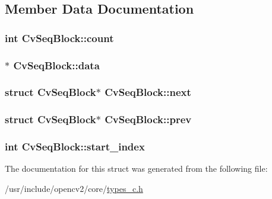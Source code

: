 \subsection{Member Data Documentation}
\hypertarget{structCvSeqBlock_a46540928aea24563e6f58210efc5241b}{
\subsubsection[{count}]{\setlength{\rightskip}{0pt plus 5cm}int Cv\-Seq\-Block\-::count}}\label{structCvSeqBlock_a46540928aea24563e6f58210efc5241b}
\hypertarget{structCvSeqBlock_a590c97caa64f80f3478d9bede539d0ae}{
\subsubsection[{data}]{$\ast$ Cv\-Seq\-Block\-::data}}\label{structCvSeqBlock_a590c97caa64f80f3478d9bede539d0ae}
\hypertarget{structCvSeqBlock_a70b6d4b52105a1e8c5def6227bcc869f}{
\subsubsection[{next}]{\setlength{\rightskip}{0pt plus 5cm}struct {\bf Cv\-Seq\-Block}$\ast$ Cv\-Seq\-Block\-::next}}\label{structCvSeqBlock_a70b6d4b52105a1e8c5def6227bcc869f}
\hypertarget{structCvSeqBlock_a16d7a9e680c3533cc670856b930e25d4}{
\subsubsection[{prev}]{\setlength{\rightskip}{0pt plus 5cm}struct {\bf Cv\-Seq\-Block}$\ast$ Cv\-Seq\-Block\-::prev}}\label{structCvSeqBlock_a16d7a9e680c3533cc670856b930e25d4}
\hypertarget{structCvSeqBlock_a0a34f720596ad287c8a2362017a37d88}{
\subsubsection[{start\-\_\-index}]{\setlength{\rightskip}{0pt plus 5cm}int Cv\-Seq\-Block\-::start\-\_\-index}}\label{structCvSeqBlock_a0a34f720596ad287c8a2362017a37d88}


The documentation for this struct was generated from the following file\-:\begin{DoxyCompactItemize}
\item 
/usr/include/opencv2/core/\hyperlink{core_2types__c_8h}{types\-\_\-c.\-h}\end{DoxyCompactItemize}
